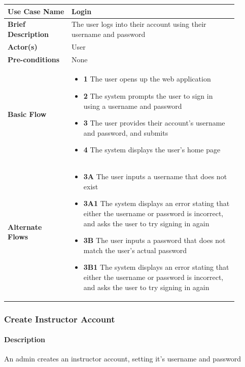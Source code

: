 \documentclass{article}
\begin{document}
\begin{tabular}{| p{0.25\linewidth} | p{0.65\linewidth} |}
  \hline
  \textbf{Use Case Name} & Login \\
  \hline
  \textbf{Brief Description} & The user logs into their account using their username and password \\
  \hline
  \textbf{Actor(s)} & User \\
  \hline
  \textbf{Pre-conditions} & None\\
  \hline
  \textbf{Basic Flow} & \begin{itemize}
    \item[] \textbf{1} The user opens up the web application
    \item[] \textbf{2} The system prompts the user to sign in using a username and password
    \item[] \textbf{3} The user provides their account's username and password, and submits
    \item[] \textbf{4} The system displays the user's home page
  \end{itemize}\\
  \hline
  \textbf{Alternate Flows} & \begin{itemize}
    \item[] \textbf{3A} The user inputs a username that does not exist
    \item[] \textbf{3A1} The system displays an error stating that either the username or password is incorrect, and asks the user to try signing in again
    \item[] \textbf{3B} The user inputs a password that does not match the user's actual password
    \item[] \textbf{3B1} The system displays an error stating that either the username or password is incorrect, and asks the user to try signing in again
  \end{itemize} \\
  \hline
\end{tabular}

\subsubsection{Create Instructor Account}

\paragraph{Description} An admin creates an instructor account, setting it's username and password
\end{document}
